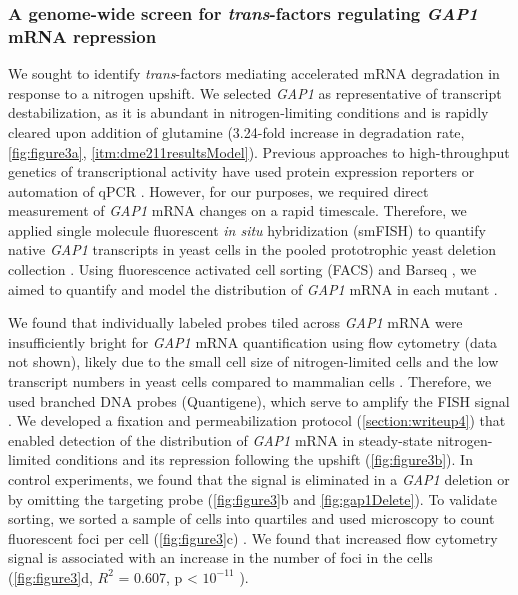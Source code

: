 \subsubsection{A genome-wide screen for \textit{trans}-factors 
  regulating \textit{GAP1} mRNA repression}

We sought to identify \textit{trans}-factors mediating accelerated mRNA
degradation in response to a nitrogen upshift. We selected \textit{GAP1} 
as representative of transcript destabilization, as it is abundant in
nitrogen-limiting conditions and is rapidly cleared upon addition of
glutamine  (3.24-fold increase in degradation rate, \autoref{fig:figure3a},
\autoref{itm:dme211resultsModel}). Previous approaches to high-throughput
genetics of transcriptional activity have used protein expression
reporters \parencite{neklesa2009genome,sliva2016barcode} or automation of qPCR 
\parencite{worley2016genome}. However, for our
purposes, we required direct measurement of \textit{GAP1} mRNA 
changes on a rapid timescale.
Therefore, we applied single molecule fluorescent \textit{in situ}
hybridization (smFISH) to quantify 
native \textit{GAP1} transcripts in yeast cells in the pooled
prototrophic yeast deletion collection \parencite{vandersluis2014broad}.
Using fluorescence activated cell sorting (FACS) and Barseq
\parencite{smith2009quantitative,robinson2014design,giaever2014yeast},
we aimed to quantify and model the distribution of \textit{GAP1} mRNA
in each mutant \parencite{kinney2010using,peterman2016sort}.



We found that
individually labeled probes tiled across \textit{GAP1} mRNA
\parencite{raj2008imaging} were insufficiently bright for
\textit{GAP1} mRNA quantification using flow cytometry (data not shown),
likely due to the small cell size of nitrogen-limited cells and the
low transcript numbers in yeast cells compared to mammalian cells
\parencite{klemm2014transcriptional}. Therefore, we used branched DNA probes
(Quantigene), which serve to amplify the FISH signal
\parencite{hanley2013detection}. We developed a fixation and permeabilization
protocol (\autoref{section:writeup4}) that enabled detection of the
distribution of  \textit{GAP1} mRNA in steady-state nitrogen-limited conditions
and its repression following the  upshift (\autoref{fig:figure3b}). In control
experiments, we found that the signal is eliminated in a \textit{GAP1} deletion
or by omitting the targeting probe%
(\autoref{fig:figure3}b and \autoref{fig:gap1Delete}). To validate
sorting, we sorted a sample of cells into quartiles and used
microscopy to count fluorescent foci per cell
(\autoref{fig:figure3}c) .
We found that increased flow cytometry signal is associated with an
increase in the number of foci in the cells (\autoref{fig:figure3}d, $R^2$ = 0.607,
p < $10^{-11}$ ). 


